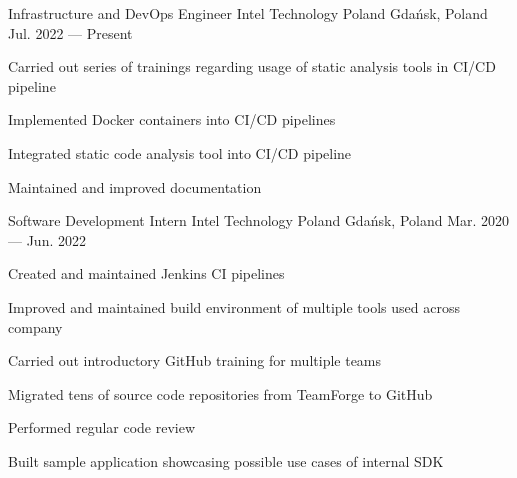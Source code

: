 
\begin{cventries}

    \cventry
    {Infrastructure and DevOps Engineer}
    {Intel Technology Poland} %
    {Gdańsk, Poland} %
    {Jul. 2022 --- Present} %
    {
        \begin{cvitems}
        \item Carried out series of trainings regarding usage of static analysis tools in CI/CD pipeline
        \item Implemented Docker containers into CI/CD pipelines
        \item Integrated static code analysis tool into CI/CD pipeline
        \item Maintained and improved documentation
        \end{cvitems}
    }

    \cventry
    {Software Development Intern} %
    {Intel Technology Poland} %
    {Gdańsk, Poland} %
    {Mar. 2020 --- Jun. 2022} %
    {
        \begin{cvitems} %
        \item {Created and maintained Jenkins CI pipelines}
        \item {Improved and maintained build environment of multiple tools used across company}
        \item {Carried out introductory GitHub training for multiple teams}
        \item {Migrated tens of source code repositories from TeamForge to GitHub}
        \item {Performed regular code review}
        \item {Built sample application showcasing possible use cases of internal SDK}
        \end{cvitems}
    }

\end{cventries}
